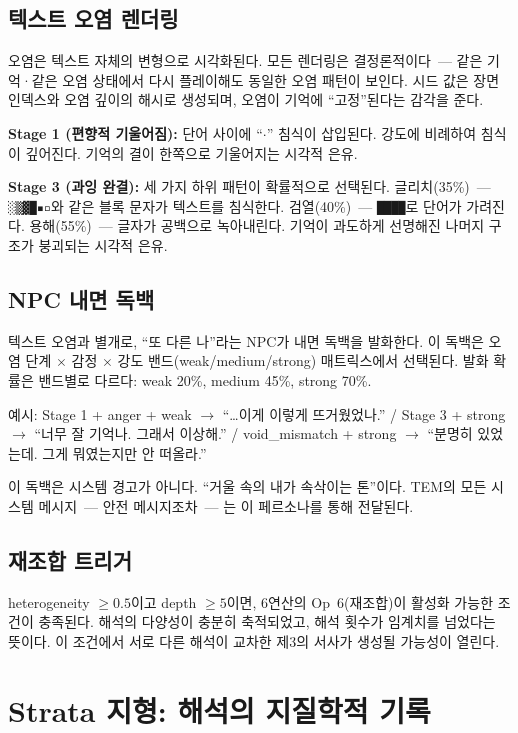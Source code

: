 \documentclass[11pt, a4paper]{article}
\begin{document}
\subsection{텍스트 오염 렌더링}

오염은 텍스트 자체의 변형으로 시각화된다. 모든 렌더링은 결정론적이다~--- 같은 기억·같은 오염 상태에서 다시 플레이해도 동일한 오염 패턴이 보인다. 시드 값은 장면 인덱스와 오염 깊이의 해시로 생성되며, 오염이 기억에 ``고정''된다는 감각을 준다.

\textbf{Stage 1 (편향적 기울어짐):} 단어 사이에 ``$\cdot$'' 침식이 삽입된다. 강도에 비례하여 침식이 깊어진다. 기억의 결이 한쪽으로 기울어지는 시각적 은유.

\textbf{Stage 3 (과잉 완결):} 세 가지 하위 패턴이 확률적으로 선택된다. 글리치(35\%)~--- \texttt{░▒▓█▪▫}와 같은 블록 문자가 텍스트를 침식한다. 검열(40\%)~--- \texttt{████}로 단어가 가려진다. 용해(55\%)~--- 글자가 공백으로 녹아내린다. 기억이 과도하게 선명해진 나머지 구조가 붕괴되는 시각적 은유.

\subsection{NPC 내면 독백}

텍스트 오염과 별개로, ``또 다른 나''라는 NPC가 내면 독백을 발화한다. 이 독백은 오염 단계 $\times$ 감정 $\times$ 강도 밴드(weak/medium/strong) 매트릭스에서 선택된다. 발화 확률은 밴드별로 다르다: weak 20\%, medium 45\%, strong 70\%.

예시: Stage 1 + anger + weak $\to$ ``\ldots 이게 이렇게 뜨거웠었나.'' / Stage 3 + strong $\to$ ``너무 잘 기억나. 그래서 이상해.'' / void\_mismatch + strong $\to$ ``분명히 있었는데. 그게 뭐였는지만 안 떠올라.''

이 독백은 시스템 경고가 아니다. ``거울 속의 내가 속삭이는 톤''이다. TEM의 모든 시스템 메시지~--- 안전 메시지조차~--- 는 이 페르소나를 통해 전달된다.

\subsection{재조합 트리거}

heterogeneity $\geq 0.5$이고 depth $\geq 5$이면, 6연산의 Op~6(재조합)이 활성화 가능한 조건이 충족된다. 해석의 다양성이 충분히 축적되었고, 해석 횟수가 임계치를 넘었다는 뜻이다. 이 조건에서 서로 다른 해석이 교차한 제3의 서사가 생성될 가능성이 열린다.


\section{Strata 지형: 해석의 지질학적 기록}
\end{document}
